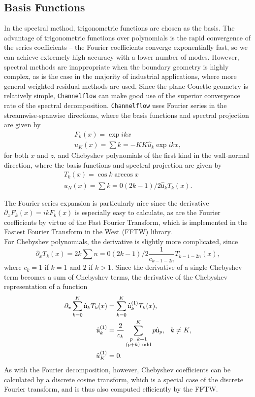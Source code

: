 \subsection{Basis Functions}

In the spectral method, trigonometric functions are chosen as the basis. The advantage of trigonometric functions over polynomials is the rapid convergence of the series coefficients -- the Fourier coefficients converge exponentially fast, so we can achieve extremely high accuracy with a lower number of modes. However, spectral methods are inappropriate when the boundary geometry is highly complex, as is the case in the majority of industrial applications, where more general weighted residual methods are used. Since the plane Couette geometry is relatively simple, {\tt Channelflow} can make good use of the superior convergence rate of the spectral decomposition. {\tt Channelflow} uses Fourier series in the streamwise-spanwise directions, where the basis functions and spectral projection are given by 
\begin{align}
F_k(x) = \exp{ikx}\\
u_K(x) = \sum{k=-K}{K}\hat{u}_k\exp{ikx},
\end{align}
for both $x$ and $z$, and Chebyshev polynomials of the first kind in the wall-normal direction, where the basis functions and spectral projection are given by
\begin{align}
T_k(x) = \cos{k\arccos{x}}\\
u_N(x) = \sum{k=0}{(2k-1)/2}\hat{\mathfrak{u}}_kT_k(x).
\end{align}
\par The Fourier series expansion is particularly nice since the derivative $\partial_x F_k(x) = ikF_k(x)$ is especially easy to calculate, as are the Fourier coefficients by virtue of the Fast Fourier Transform, which is implemented in the Fastest Fourier Transform in the West (FFTW) library.\\

For Chebyshev polynomials, the derivative is slightly more complicated, since 
\begin{equation}
\partial_x T_k(x) = 2k\sum{n=0}{(2k-1)/2}{\frac{1}{c_{k-1-2n}} T_{k-1-2n}(x)},
\end{equation}
where $c_k = 1$ if $k=1$ and $2$ if $k > 1$. Since the derivative of a single Chebyshev term becomes a sum of Chebyshev terms, the derivative of the Chebyshev representation of a function 
\begin{align}
\partial_x \sum{k=0}{K}\hat{\mathfrak{u}}_kT_k(x) &= \sum{k=0}{K}\hat{\mathfrak{u}}_k^{(1)}T_k(x),\\
\hat{\mathfrak{u}}_k^{(1)} &= \frac{2}{c_k}\sum{\substack{p = k+1\\(p+k) \mathrm{~odd}}}{K} p \hat{\mathfrak{u}}_p, \hspace{0.25cm} k \neq K,\\
\hat{u}^{(1)}_K &= 0.
\end{align}
As with the Fourier decomposition, however, Chebyshev coefficients can be calculated by a discrete cosine transform, which is a special case of the discrete Fourier transform, and is thus also computed efficiently by the FFTW. 

